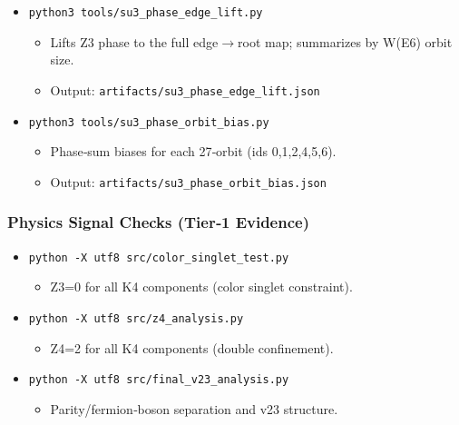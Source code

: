 \documentclass[11pt]{article}
\providecommand{\tightlist}{%
  \setlength{\itemsep}{0pt}\setlength{\parskip}{0pt}}
\begin{document}
\begin{itemize}
  \begin{itemize}
  \tightlist
  \item
    Compares Coxeter‑6 orbit phases to the canonical F3 phase
    assignment.
  \item
    Output: \texttt{artifacts/e8\_coxeter\_phase\_vs\_f3.json}
  \end{itemize}
\item
  \texttt{python3\ tools/su3\_phase\_edge\_lift.py}

  \begin{itemize}
  \tightlist
  \item
    Lifts Z3 phase to the full edge\ensuremath{\rightarrow}root map;
    summarizes by W(E6) orbit size.
  \item
    Output: \texttt{artifacts/su3\_phase\_edge\_lift.json}
  \end{itemize}
\item
  \texttt{python3\ tools/su3\_phase\_orbit\_bias.py}

  \begin{itemize}
  \tightlist
  \item
    Phase‑sum biases for each 27‑orbit (ids 0,1,2,4,5,6).
  \item
    Output: \texttt{artifacts/su3\_phase\_orbit\_bias.json}
  \end{itemize}
\end{itemize}

\subsubsection{Physics Signal Checks (Tier‑1
Evidence)}\label{physics-signal-checks-tier1-evidence}

\begin{itemize}
\tightlist
\item
  \texttt{python\ -X\ utf8\ src/color\_singlet\_test.py}

  \begin{itemize}
  \tightlist
  \item
    Z3=0 for all K4 components (color singlet constraint).
  \end{itemize}
\item
  \texttt{python\ -X\ utf8\ src/z4\_analysis.py}

  \begin{itemize}
  \tightlist
  \item
    Z4=2 for all K4 components (double confinement).
  \end{itemize}
\item
  \texttt{python\ -X\ utf8\ src/final\_v23\_analysis.py}

  \begin{itemize}
  \tightlist
  \item
    Parity/fermion‑boson separation and v23 structure.
  \end{itemize}
\end{itemize}
\end{document}

